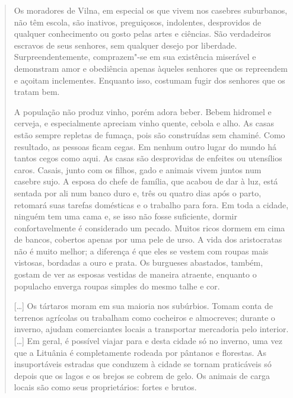 \begin{quote}
Os moradores de Vilna, em especial os que vivem nos casebres suburbanos,
não têm escola, são inativos, preguiçosos, indolentes, desprovidos de
qualquer conhecimento ou gosto pelas artes e ciências. São verdadeiros
escravos de seus senhores, sem qualquer desejo por liberdade.
Surpreendentemente, comprazem"-se em sua existência miserável e
demonstram amor e obediência apenas àqueles senhores que os repreendem e
açoitam inclementes. Enquanto isso, costumam fugir dos senhores que os
tratam bem.

A população não produz vinho, porém adora beber. Bebem hidromel e
cerveja, e especialmente apreciam vinho quente, cebola e alho. As casas
estão sempre repletas de fumaça, pois são construídas sem chaminé. Como
resultado, as pessoas ficam cegas. Em nenhum outro lugar do mundo há
tantos cegos como aqui. As casas são desprovidas de enfeites ou
utensílios caros. Casais, junto com os filhos, gado e animais vivem
juntos num casebre sujo. A esposa do chefe de família, que acabou de dar
à luz, está sentada por ali num banco duro e, três ou quatro dias após o
parto, retomará suas tarefas domésticas e o trabalho para fora. Em toda
a cidade, ninguém tem uma cama e, se isso não fosse suficiente, dormir
confortavelmente é considerado um pecado. Muitos ricos dormem em cima de
bancos, cobertos apenas por uma pele de urso. A vida dos aristocratas
não é muito melhor; a diferença é que eles se vestem com roupas mais
vistosas, bordadas a ouro e prata. Os burgueses abastados, também,
gostam de ver as esposas vestidas de maneira atraente, enquanto o
populacho enverga roupas simples do mesmo talhe e cor.

[\ldots{}] Os tártaros moram em sua maioria nos subúrbios. Tomam conta de
terrenos agrícolas ou trabalham como cocheiros e almocreves; durante o
inverno, ajudam comerciantes locais a transportar mercadoria pelo
interior. [\ldots{}] Em geral, é possível viajar para e desta cidade só no
inverno, uma vez que a Lituânia é completamente rodeada por pântanos e
florestas. As insuportáveis estradas que conduzem à cidade se tornam
praticáveis só depois que os lagos e os brejos se cobrem de gelo. Os
animais de carga locais são como seus proprietários: fortes e brutos.


\end{quote}
